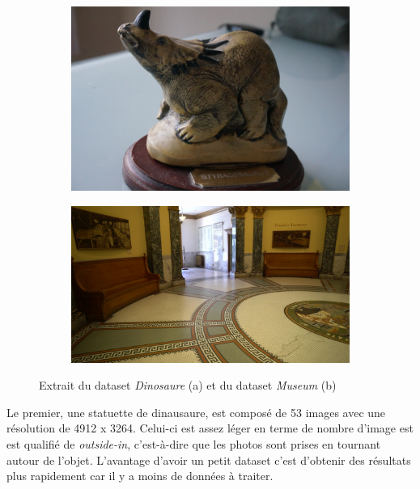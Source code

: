 \begin{figure}[ht]
    \centering
    \begin{subfigure}{0.40\textwidth}
        \includegraphics[width=\linewidth]{datas/dino_image.jpg}
        \caption{}
    \end{subfigure}
    \begin{subfigure}{0.47\textwidth}
        \includegraphics[width=\linewidth]{datas/museum_image.jpg}
        \caption{}
    \end{subfigure}

    \caption{Extrait du dataset \emph{Dinosaure} (a) et du dataset \emph{Museum} (b)}
    \label{fig:dataset_exemple}
\end{figure}

Le premier, une statuette de dinausaure, est composé de 53 images avec une résolution de 4912 x 3264. Celui-ci est assez léger en terme de nombre d'image est est qualifié de \emph{outside-in}, c'est-à-dire que les photos sont prises en tournant autour de l'objet. L'avantage d'avoir un petit dataset c'est d'obtenir des résultats plus rapidement car il y a moins de données à traiter. 

